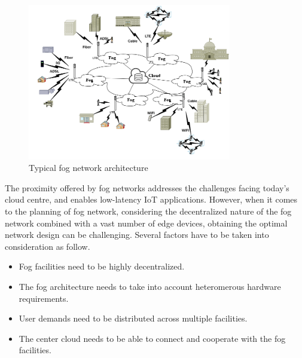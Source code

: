 \documentclass[10pt,journal,compsoc]{IEEEtran}
\newcommand{\Fig}[1]{Fig.~\ref{#1}}
\begin{document}
\begin{figure}[h]
\centerline{\includegraphics[width=3.5in]{fog-g.png}}
\caption{Typical fog network architecture} 
\label{foggg}
\end{figure}
%




The proximity offered by fog networks addresses the challenges facing today's cloud centre, and enables low-latency IoT applications.
However, when it comes to the planning of fog network, considering the decentralized nature of the fog network combined with a vast number of edge devices, obtaining the optimal network design can be challenging. 
Several factors have to be taken into consideration as follow.
\begin{itemize}
\item Fog facilities need to be highly decentralized.
\item The fog architecture needs to take into account heteromerous hardware requirements.
\item User demands need to be distributed across multiple facilities.
\item The center cloud needs to be able to connect and cooperate with the fog facilities.
\end{itemize}
\end{document}

